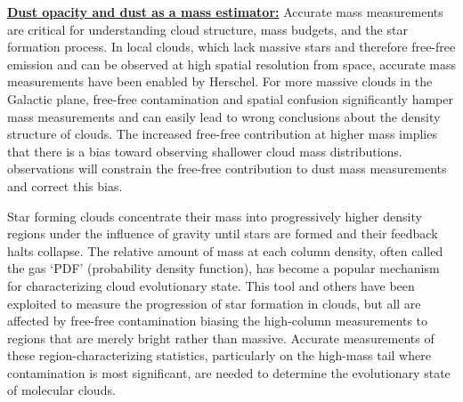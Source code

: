 \documentclass[11pt,preprint]{aastex_nofoot}
\begin{document}
\indent\underline{\textbf{\helv Dust opacity and dust as a mass estimator:}} 
Accurate mass measurements are critical for understanding cloud
structure, mass budgets, and the star formation process.  In local clouds,
which lack massive stars and therefore free-free emission and can be observed
at high spatial resolution from space, accurate mass measurements have been
enabled by Herschel.  For more massive clouds in the Galactic plane, free-free
contamination and spatial confusion significantly hamper mass measurements and
can easily lead to wrong conclusions about the density structure of clouds.
The increased free-free contribution at higher mass implies that there is 
a bias toward observing shallower cloud mass distributions.
\MUSTANG observations will constrain the free-free contribution
to dust mass measurements and correct this bias.

Star forming clouds concentrate their mass into progressively higher density
regions under the influence of gravity until stars are formed and their
feedback halts collapse.  The relative amount of mass at each column density,
often called the gas `PDF' (probability density function), has become a popular
mechanism for characterizing cloud evolutionary state.  This tool and others
\citep[e.g., column autocorrelation functions,][]{Lin2016a}  have been exploited
to measure the progression of star formation in clouds, but all are affected by
free-free contamination biasing the high-column measurements to regions that
are merely bright rather than massive.  Accurate measurements of these
region-characterizing statistics, particularly on the high-mass tail where
contamination is most significant, are needed to determine the evolutionary
state of molecular clouds.

\end{document}
